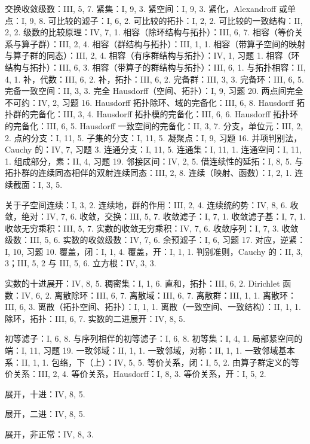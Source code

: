 交换收敛级数：III, 5, 7. 紧集：I, 9, 3. 紧空间：I, 9, 3. 紧化，Alexandroff 或单点：I, 9, 8. 可比较的滤子：I, 6, 2. 可比较的拓扑：I, 2, 2. 可比较的一致结构：II, 2, 2. 级数的比较原理：IV, 7, 1. 相容（除环结构与拓扑）：III, 6, 7. 相容（等价关系与算子群）：III, 2, 4. 相容（群结构与拓扑）：III, 1, 1. 相容（带算子空间的映射与算子群的同态）：III, 2, 4. 相容（有序群结构与拓扑）：IV, 1, 习题 1. 相容（环结构与拓扑）：III, 6, 3. 相容（带算子的群结构与拓扑）：III, 6, 1. 与拓扑相容：II, 4, 1. 补，代数：III, 6, 2. 补，拓扑：III, 6, 2. 完备群：III, 3, 3. 完备环：III, 6, 5. 完备一致空间：II, 3, 3. 完全 Hausdorff（空间、拓扑）：I, 9, 习题 20. 两点间完全不可约：IV, 2, 习题 16. Hausdorff 拓扑除环、域的完备化：III, 6, 8. Hausdorff 拓扑群的完备化：III, 3, 4. Hausdorff 拓扑模的完备化：III, 6, 6. Hausdorff 拓扑环的完备化：III, 6, 5. Hausdorff 一致空间的完备化：II, 3, 7. 分支，单位元：III, 2, 2. 点的分支：I, 11, 5. 子集的分支：I, 11, 5. 凝聚点：I, 9, 习题 16. 并项判别法，Cauchy 的：IV, 7, 习题 3. 连通分支：I, 11, 5. 连通集：I, 11, 1. 连通空间：I, 11, 1. 组成部分，素：II, 4, 习题 19. 邻接区间：IV, 2, 5. 借连续性的延拓：I, 8, 5. 与拓扑群的连续同态相伴的双射连续同态：III, 2, 8. 连续（映射、函数）：I, 2, 1. 连续截面：I, 3, 5.

关于子空间连续：I, 3, 2. 连续地，群的作用：III, 2, 4. 连续统的势：IV, 8, 6. 收敛，绝对：IV, 7, 6. 收敛，交换：III, 5, 7. 收敛滤子：I, 7, 1. 收敛滤子基：I, 7, 1. 收敛无穷乘积：III, 5, 7. 实数的收敛无穷乘积：IV, 7, 6. 收敛序列：I, 7, 3. 收敛级数：III, 5, 6. 实数的收敛级数：IV, 7, 6. 余预滤子：I, 6, 习题 17. 对应，逆紧：I, 10, 习题 10. 覆盖，闭：I, 1, 4. 覆盖，开：I, 1, 1. 判别准则，Cauchy 的：II, 3, 3；III, 5, 2 与 III, 5, 6. 立方根：IV, 3, 3.

实数的十进展开：IV, 8, 5. 稠密集：I, 1, 6. 直和，拓扑：III, 6, 2. Dirichlet 函数：IV, 6, 2. 离散除环：III, 6, 7. 离散域：III, 6, 7. 离散群：III, 1, 1. 离散环：III, 6, 3. 离散（拓扑空间、拓扑）：I, 1, 1. 离散（一致空间、一致结构）：II, 1, 1. 除环，拓扑：III, 6, 7. 实数的二进展开：IV, 8, 5.

初等滤子：I, 6, 8. 与序列相伴的初等滤子：I, 6, 8. 初等集：I, 4, 1. 局部紧空间的端：I, 11, 习题 19. 一致邻域：II, 1, 1. 一致邻域，对称：II, 1, 1. 一致邻域基本系：II, 1, 1. 包络，下（上）：IV, 5, 5. 等价关系，闭：I, 5, 2. 由算子群定义的等价关系：III, 2, 4. 等价关系，Hausdorff：I, 8, 3. 等价关系，开：I, 5, 2.

展开，十进：IV, 8, 5.

展开，二进：IV, 8, 5.

展开，非正常：IV, 8, 3.

